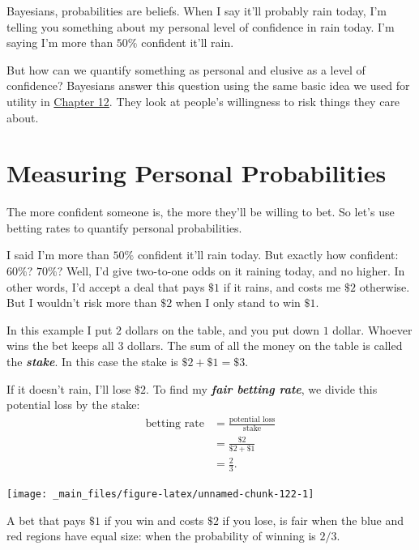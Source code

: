 \documentclass[justified]{tufte-book}
\theoremstyle{definition}
\theoremstyle{definition}
\theoremstyle{definition}
\theoremstyle{definition}
\theoremstyle{remark}
\begin{document}
 Bayesians, probabilities are beliefs. When I say it'll probably rain today, I'm telling you something about my personal level of confidence in rain today. I'm saying I'm more than \(50\%\) confident it'll rain.

But how can we quantify something as personal and elusive as a level of confidence? Bayesians answer this question using the same basic idea we used for utility in \protect\hyperlink{utility}{Chapter 12}. They look at people's willingness to risk things they care about.

\hypertarget{measuring-personal-probabilities}{%
\section{Measuring Personal Probabilities}\label{measuring-personal-probabilities}}

The more confident someone is, the more they'll be willing to bet. So let's use betting rates to quantify personal probabilities.

I said I'm more than \(50\%\) confident it'll rain today. But exactly how confident: \(60\%\)? \(70\%\)? Well, I'd give two-to-one odds on it raining today, and no higher. In other words, I'd accept a deal that pays \(\$1\) if it rains, and costs me \(\$2\) otherwise. But I wouldn't risk more than \(\$2\) when I only stand to win \(\$1\).

In this example I put \(2\) dollars on the table, and you put down \(1\) dollar. Whoever wins the bet keeps all \(3\) dollars. The sum of all the money on the table is called the \textbf{\emph{stake}}. In this case the stake is \(\$2 + \$1 = \$3\).

If it doesn't rain, I'll lose \(\$2\). To find my \textbf{\emph{fair betting rate}}, we divide this potential loss by the stake:
\[
  \begin{aligned}
    \mbox{betting rate} &= \frac{\mbox{potential loss}}{\mbox{stake}}\\
                        &= \frac{\$2}{\$2 + \$1}\\
                        &= \frac{2}{3}.
  \end{aligned}
\]

\begin{marginfigure}
\texttt{[image: \_main\_files/figure-latex/unnamed-chunk-122-1]} \caption[A bet that pays $\$1$ if you win and costs $\$2$ if you lose, is fair when the blue and red regions have equal size]{A bet that pays $\$1$ if you win and costs $\$2$ if you lose, is fair when the blue and red regions have equal size: when the probability of winning is $2/3$.}\label{fig:unnamed-chunk-122}
\end{marginfigure}
\end{document}
